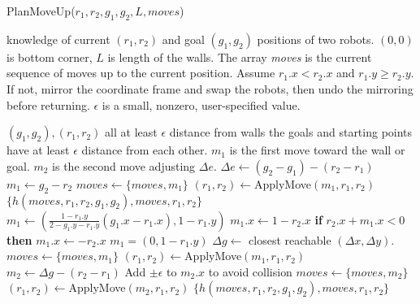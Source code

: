 \begin{algorithm}
\caption{{\sc PlanMoveUp}($r_1,r_2,g_1,g_2,L, moves$)}\label{alg:Wallup}
\begin{algorithmic}[1]
\Require knowledge of current $(r_1,r_2)$ and goal $(g_1,g_2)$ positions of  two robots. 
$(0,0)$ is bottom corner,
 $L$ is length of the walls. 
 The array \emph{moves} is the current sequence of moves up to the current position.
 Assume $r_1.x < r_2.x$ and $r_1.y \geq r_2.y$. If not, mirror the coordinate frame and swap the robots, then undo the mirroring before returning.
 $\epsilon $ is a small, nonzero, user-specified value.
 
\Ensure $(g_1, g_2) , (r_1, r_2)$ all at least $\epsilon$ distance from walls the goals and starting points have at least $\epsilon$ distance from each other.  
$m_1$ is the first move toward the wall or goal.
 $m_2$ is the second move adjusting $\Delta e$.
\State $\Delta e \gets (g_2 - g_1)- (r_2- r_1)$
 
\State $m_1  \gets g_2 -  r_2$
\State $moves \gets \{ moves,   m_1 \}$
\State $(r_1,r_2) \gets ${\sc ApplyMove}$(m_1,r_1,r_2)$
\State \Return $\{h(moves, r_1,r_2,g_1,g_2), moves,r_1,r_2\}$
\EndIf
{} 
\State $m_1 \gets \left(\frac{1-r_1.y}{2-g_1.y-r_1.y} (g_1.x -r_1.x), 1-r_1.y \right)$
\State $m_1.x \gets 1- r_2.x$
\Else \textbf{ if} {$r_2.x + m_1.x < 0$}  \textbf{then}
\State $m_1.x \gets -r_2.x$
\EndIf
\Else 
\State $m_1 = (0, 1-r_1.y)$
\State $\Delta g \gets $ closest reachable $(\Delta x,\Delta y)$.
\EndIf
\State $moves \gets \{ moves,   m_1\}$
\State $(r_1,r_2) \gets ${\sc ApplyMove}$(m_1,r_1,r_2)$
\State $m_2 \gets \Delta g -  (r_2- r_1)$
\State Add $\pm \epsilon$ to $m_2.x$ to avoid collision
\EndIf
\State $moves \gets \{ moves,   m_2\}$
\State $(r_1,r_2) \gets ${\sc ApplyMove}$(m_2,r_1,r_2)$
\State \Return $\{h(moves, r_1,r_2,g_1,g_2), moves,r_1,r_2\}$
\end{algorithmic}
\end{algorithm}




